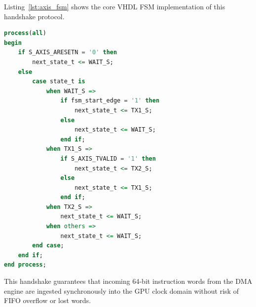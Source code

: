 Listing~\ref{lst:axis_fsm} shows the core VHDL FSM implementation of this handshake protocol.

\begin{lstlisting}[language=VHDL, caption={AXI4-Stream Handshake and State Machine in \texttt{myaxistream\_v1\_0\_S\_AXIS.vhd}.}, label={lst:axis_fsm}]
process(all) 
begin
    if S_AXIS_ARESETN = '0' then
        next_state_t <= WAIT_S;
    else 
        case state_t is
            when WAIT_S => 
                if fsm_start_edge = '1' then
                    next_state_t <= TX1_S;
                else 
                    next_state_t <= WAIT_S;
                end if;
            when TX1_S =>
                if S_AXIS_TVALID = '1' then
                    next_state_t <= TX2_S;
                else 
                    next_state_t <= TX1_S;
                end if;
            when TX2_S =>
                next_state_t <= WAIT_S;
            when others => 
                next_state_t <= WAIT_S;        
        end case;
    end if;        
end process;
\end{lstlisting}

This handshake guarantees that incoming 64-bit instruction words from the DMA engine are ingested synchronously into the GPU clock domain without risk of FIFO overflow or lost words.
